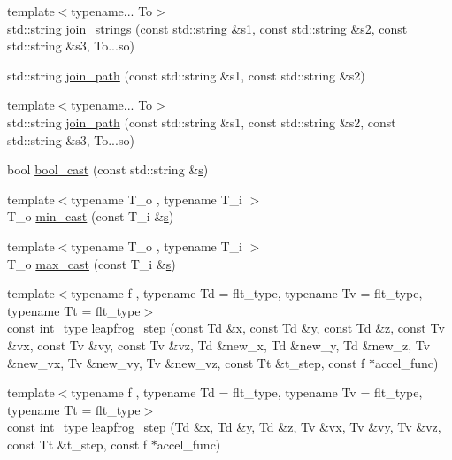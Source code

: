 \begin{DoxyCompactItemize}
\item 
{\footnotesize template$<$typename... To$>$ }\\std\-::string \hyperlink{namespaceIceBRG_a9852cb8b07f894ff48d4af25870bba33}{join\-\_\-strings} (const std\-::string \&s1, const std\-::string \&s2, const std\-::string \&s3, To...\-so)
\item 
std\-::string \hyperlink{namespaceIceBRG_ac55f20ecca54f7f764524d2d48242e8c}{join\-\_\-path} (const std\-::string \&s1, const std\-::string \&s2)
\item 
{\footnotesize template$<$typename... To$>$ }\\std\-::string \hyperlink{namespaceIceBRG_aa0859ec40cf4e02d03a53f29b939a676}{join\-\_\-path} (const std\-::string \&s1, const std\-::string \&s2, const std\-::string \&s3, To...\-so)
\item 
bool \hyperlink{namespaceIceBRG_ab1e55cf51f919239eb88b3d4e6a2d2d9}{bool\-\_\-cast} (const std\-::string \&\hyperlink{namespaceIceBRG_ad0b9ada1ad5ccc9d88c2050483109e06}{s})
\item 
{\footnotesize template$<$typename T\-\_\-o , typename T\-\_\-i $>$ }\\T\-\_\-o \hyperlink{namespaceIceBRG_a7808efd6744cf133cf249120e8df5cb5}{min\-\_\-cast} (const T\-\_\-i \&\hyperlink{namespaceIceBRG_ad0b9ada1ad5ccc9d88c2050483109e06}{s})
\item 
{\footnotesize template$<$typename T\-\_\-o , typename T\-\_\-i $>$ }\\T\-\_\-o \hyperlink{namespaceIceBRG_a27981cf15a5a2520505203f61a5bf4b3}{max\-\_\-cast} (const T\-\_\-i \&\hyperlink{namespaceIceBRG_ad0b9ada1ad5ccc9d88c2050483109e06}{s})
\item 
{\footnotesize template$<$typename f , typename Td  = flt\-\_\-type, typename Tv  = flt\-\_\-type, typename Tt  = flt\-\_\-type$>$ }\\const \hyperlink{lib_2IceBRG__main_2common_8h_ac4de9d9335536ac22821171deec8d39e}{int\-\_\-type} \hyperlink{namespaceIceBRG_afdc416d05295db2480bc85842942cf27}{leapfrog\-\_\-step} (const Td \&x, const Td \&y, const Td \&z, const Tv \&vx, const Tv \&vy, const Tv \&vz, Td \&new\-\_\-x, Td \&new\-\_\-y, Td \&new\-\_\-z, Tv \&new\-\_\-vx, Tv \&new\-\_\-vy, Tv \&new\-\_\-vz, const Tt \&t\-\_\-step, const f $\ast$accel\-\_\-func)
\item 
{\footnotesize template$<$typename f , typename Td  = flt\-\_\-type, typename Tv  = flt\-\_\-type, typename Tt  = flt\-\_\-type$>$ }\\const \hyperlink{lib_2IceBRG__main_2common_8h_ac4de9d9335536ac22821171deec8d39e}{int\-\_\-type} \hyperlink{namespaceIceBRG_a0e0b347c2e0c02cb1558169ebfcf74b8}{leapfrog\-\_\-step} (Td \&x, Td \&y, Td \&z, Tv \&vx, Tv \&vy, Tv \&vz, const Tt \&t\-\_\-step, const f $\ast$accel\-\_\-func)

\end{DoxyCompactItemize}
